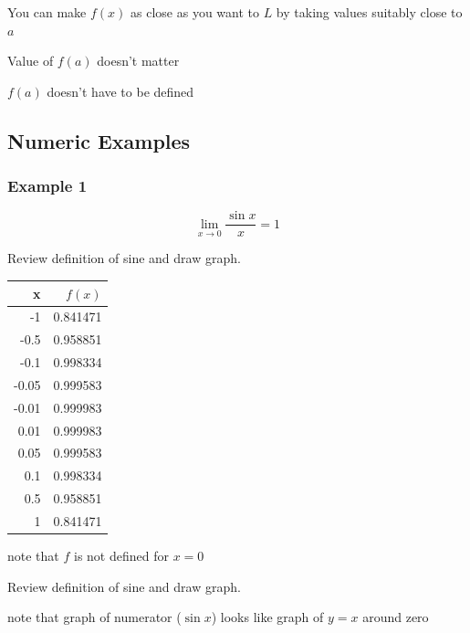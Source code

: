 \documentclass[letterpaper, landscape]{exam}
\begin{document}
  \begin{itemize*}
    \item You can make $f(x)$ as close as you want to $L$ by taking values suitably
      close to $a$
    \item Value of $f(a)$ doesn't matter
    \item $f(a)$ doesn't have to be defined
  \end{itemize*}

  \subsection{Numeric Examples}

  \subsubsection{Example 1}
  \[
    \lim_{x \to 0} \frac{\sin x}{x} = 1
  \]

  Review definition of sine and draw graph.

  \begin{tabular}[H]{rr}
    \toprule
    x     & $f(x)$ \\
    \midrule
    -1    & 0.841471 \\
    -0.5  & 0.958851 \\
    -0.1  & 0.998334 \\
    -0.05 & 0.999583 \\
    -0.01 & 0.999983 \\
    0.01  & 0.999983 \\
    0.05  & 0.999583 \\
    0.1   & 0.998334 \\
    0.5   & 0.958851 \\
    1     & 0.841471 \\
    \bottomrule
  \end{tabular}

  \begin{itemize*}
    \item note that $f$ is not defined for $x = 0$
    \item Review definition of sine and draw graph.
    \item note that graph of numerator ($\sin x$) looks like graph of $y = x$ around zero
  \end{itemize*}
\end{document}

